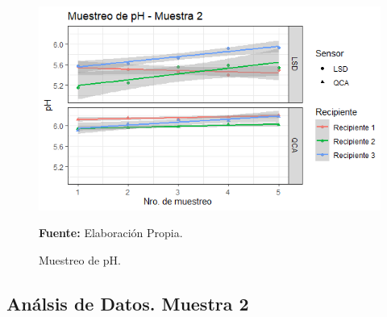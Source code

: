     \begin{figure}[H]
        \centering
        \includegraphics[width=0.75\linewidth]{Imagenes/cap4/pH_M2.png}
        \caption {Muestreo de pH. }{\textbf{Fuente:}
        Elaboraci\'on Propia. }
        \label{fig:M2PH}
    \end{figure}

\subsection{An\'alsis de Datos. Muestra 2}

